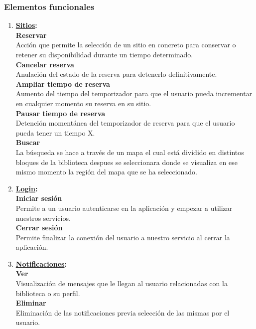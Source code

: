 \documentclass[12pt]{article}
\begin{document}
\subsubsection{Elementos funcionales}
\begin{enumerate}

\item \textbf{\underline{Sitios}:}\\
\textbf{Reservar}\\
Acción que permite la selección de un sitio en concreto para conservar o retener su disponibilidad durante un tiempo determinado.\\
\textbf{Cancelar reserva}\\
Anulación del estado de la reserva para detenerlo definitivamente. \\
\textbf{Ampliar tiempo de reserva}\\
Aumento del tiempo del temporizador para que el usuario pueda incrementar en cualquier momento su reserva en su sitio.\\
\textbf{Pausar tiempo de reserva}\\
Detención momentánea del temporizador de reserva para que el usuario pueda tener un tiempo X.\\
\textbf{Buscar}\\
La búsqueda se hace a través de un mapa el cual está dividido en distintos bloques de la biblioteca despues se seleccionara donde se visualiza en ese mismo momento la región del mapa que se ha seleccionado.         

\item \textbf{\underline{Login}:}\\
\textbf{Iniciar sesión}\\
Permite a un usuario autenticarse en la aplicación y empezar a utilizar nuestros servicios.\\
\textbf{Cerrar sesión}\\
Permite finalizar la conexión del usuario a nuestro servicio al cerrar la aplicación.\\
    
\item \textbf{\underline{Notificaciones}:}\\
\textbf{Ver }\\
Visualización de mensajes que le llegan al usuario relacionadas con la biblioteca o su perfil.\\
\textbf{Eliminar }\\
Eliminación de las notificaciones previa selección de las mismas por el usuario.\\


\end{enumerate}
\end{document}
